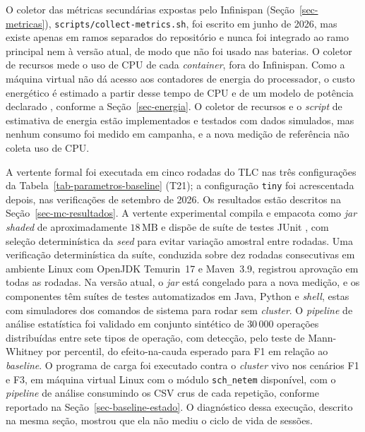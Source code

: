 O coletor das métricas secundárias expostas pelo Infinispan (Seção~\ref{sec-metricas}), \texttt{scripts/collect-metrics.sh}, foi escrito em junho de 2026, mas existe apenas em ramos separados do repositório e nunca foi integrado ao ramo principal nem à versão atual, de modo que não foi usado nas baterias. O coletor de recursos mede o uso de CPU de cada \emph{container}, fora do Infinispan. Como a máquina virtual não dá acesso aos contadores de energia do processador, o custo energético é estimado a partir desse tempo de CPU e de um modelo de potência declarado \citep{fan_power_provisioning_2007, kansal_vm_power_2010}, conforme a Seção~\ref{sec-energia}. O coletor de recursos e o \emph{script} de estimativa de energia estão implementados e testados com dados simulados, mas nenhum consumo foi medido em campanha, e a nova medição de referência não coleta uso de CPU.

A vertente formal foi executada em cinco rodadas do TLC nas três configurações da Tabela~\ref{tab-parametros-baseline} (T21); a configuração \texttt{tiny} foi acrescentada depois, nas verificações de setembro de 2026. Os resultados estão descritos na Seção~\ref{sec-mc-resultados}. A vertente experimental compila e empacota como \emph{jar shaded} de aproximadamente $18\,\text{MB}$ e dispõe de suíte de testes JUnit \citep{junit5}, com seleção determinística da \emph{seed} para evitar variação amostral entre rodadas. Uma verificação determinística da suíte, conduzida sobre dez rodadas consecutivas em ambiente Linux com OpenJDK Temurin~17 e Maven~3.9, registrou aprovação em todas as rodadas. Na versão atual, o \emph{jar} está congelado para a nova medição, e os componentes têm suítes de testes automatizados em Java, Python e \emph{shell}, estas com simuladores dos comandos de sistema para rodar sem \emph{cluster}. O \emph{pipeline} de análise estatística foi validado em conjunto sintético de $30\,000$ operações distribuídas entre sete tipos de operação, com detecção, pelo teste de Mann-Whitney por percentil, do efeito-na-cauda esperado para F1 em relação ao \emph{baseline}. O programa de carga foi executado contra o \emph{cluster} vivo nos cenários F1 e F3, em máquina virtual Linux com o módulo \texttt{sch\_netem} disponível, com o \emph{pipeline} de análise consumindo os CSV crus de cada repetição, conforme reportado na Seção~\ref{sec-baseline-estado}. O diagnóstico dessa execução, descrito na mesma seção, mostrou que ela não mediu o ciclo de vida de sessões.

